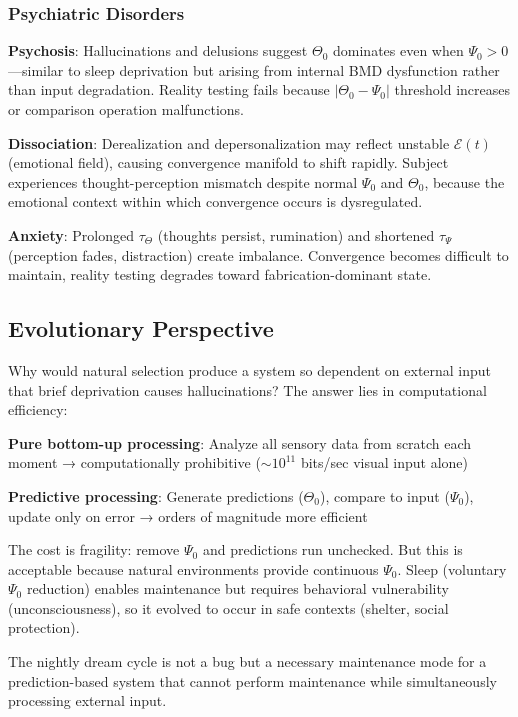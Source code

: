 \documentclass[11pt,a4paper]{article}
\begin{document}
\subsubsection{Psychiatric Disorders}

\textbf{Psychosis}: Hallucinations and delusions suggest $\Theta_0$ dominates even when $\Psi_0 > 0$—similar to sleep deprivation but arising from internal BMD dysfunction rather than input degradation. Reality testing fails because $|\Theta_0 - \Psi_0|$ threshold increases or comparison operation malfunctions.

\textbf{Dissociation}: Derealization and depersonalization may reflect unstable $\mathcal{E}(t)$ (emotional field), causing convergence manifold to shift rapidly. Subject experiences thought-perception mismatch despite normal $\Psi_0$ and $\Theta_0$, because the emotional context within which convergence occurs is dysregulated.

\textbf{Anxiety}: Prolonged $\tau_{\Theta}$ (thoughts persist, rumination) and shortened $\tau_{\Psi}$ (perception fades, distraction) create imbalance. Convergence becomes difficult to maintain, reality testing degrades toward fabrication-dominant state.

\subsection{Evolutionary Perspective}

Why would natural selection produce a system so dependent on external input that brief deprivation causes hallucinations? The answer lies in computational efficiency:

\textbf{Pure bottom-up processing}: Analyze all sensory data from scratch each moment → computationally prohibitive ($\sim 10^{11}$ bits/sec visual input alone)

\textbf{Predictive processing}: Generate predictions ($\Theta_0$), compare to input ($\Psi_0$), update only on error → orders of magnitude more efficient

The cost is fragility: remove $\Psi_0$ and predictions run unchecked. But this is acceptable because natural environments provide continuous $\Psi_0$. Sleep (voluntary $\Psi_0$ reduction) enables maintenance but requires behavioral vulnerability (unconsciousness), so it evolved to occur in safe contexts (shelter, social protection).

The nightly dream cycle is not a bug but a necessary maintenance mode for a prediction-based system that cannot perform maintenance while simultaneously processing external input.
\end{document}
